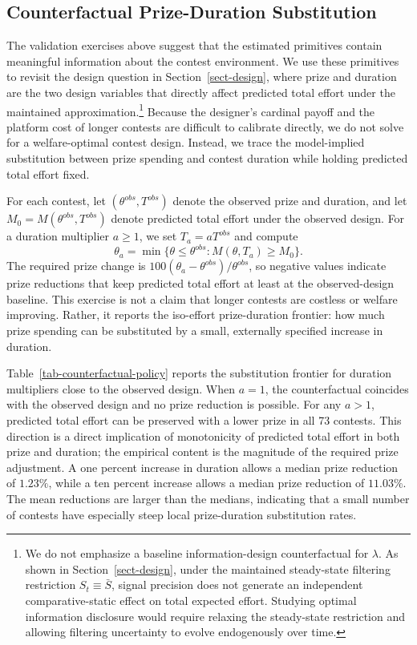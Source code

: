 \documentclass[mnsc]{informs3}
\begin{document}
\subsection{Counterfactual Prize-Duration Substitution}

The validation exercises above suggest that the estimated primitives contain
meaningful information about the contest environment. We use these primitives to
revisit the design question in Section~\ref{sect-design}, where prize and
duration are the two design variables that directly affect predicted total
effort under the maintained approximation.\footnote{
We do not emphasize a baseline information-design counterfactual for
$\lambda$. As shown in Section~\ref{sect-design}, under the maintained
steady-state filtering restriction $S_t\equiv\bar S$, signal precision does not
generate an independent comparative-static effect on total expected effort.
Studying optimal information disclosure would require relaxing the steady-state
restriction and allowing filtering uncertainty to evolve endogenously over time.
}
Because the designer's cardinal payoff and the platform cost of longer contests
are difficult to calibrate directly, we do not solve for a welfare-optimal
contest design. Instead, we trace the model-implied substitution between prize
spending and contest duration while holding predicted total effort fixed.

For each contest, let $(\theta^{obs},T^{obs})$ denote the observed prize and
duration, and let
$M_0=M(\theta^{obs},T^{obs})$ denote predicted total effort under the observed
design. For a duration multiplier $a\geq1$, we set
$T_a=aT^{obs}$ and compute
\[
\theta_a=\min\{\theta\leq\theta^{obs}:M(\theta,T_a)\geq M_0\}.
\]
The required prize change is
$100(\theta_a-\theta^{obs})/\theta^{obs}$, so negative values indicate prize
reductions that keep predicted total effort at least at the observed-design
baseline. This exercise is not a claim that longer contests are costless or
welfare improving. Rather, it reports the iso-effort prize-duration frontier:
how much prize spending can be substituted by a small, externally specified
increase in duration.

Table~\ref{tab-counterfactual-policy} reports the substitution frontier for
duration multipliers close to the observed design. When $a=1$, the
counterfactual coincides with the observed design and no prize reduction is
possible. For any $a>1$, predicted total effort can be preserved with a lower
prize in all 73 contests. This direction is a direct implication of monotonicity
of predicted total effort in both prize and duration; the empirical content is
the magnitude of the required prize adjustment. A one percent increase in
duration allows a median prize reduction of $1.23\%$, while a ten percent
increase allows a median prize reduction of $11.03\%$. The mean reductions are
larger than the medians, indicating that a small number of contests have
especially steep local prize-duration substitution rates.
\end{document}
